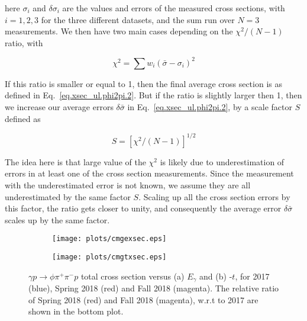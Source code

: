 \noindent here $\sigma_{i}$ and $\delta \sigma_{i}$ are the values and errors of the measured cross sections, with $i=1,2,3$ for the three different datasets, and the sum run over $N=3$ measurements. We then have two main cases depending on the $\chi^{2}/(N-1)$ ratio, with 

\begin{equation}
    \label{eq.xsec_ul.phi2pi.3}
    \chi^{2} = \sum w_{i}(\bar{\sigma}-\sigma_{i})^2
\end{equation}

If this ratio is smaller or equal to 1, then the final average cross section is as defined in Eq.~\ref{eq.xsec_ul.phi2pi.2}. But if the ratio is slightly larger then 1, then we increase our average errors $\delta\bar{\sigma}$ in Eq.~\ref{eq.xsec_ul.phi2pi.2}, by a scale factor $S$ defined as

\begin{equation}
    \label{eq.xsec_ul.phi2pi.4}
    S = [\chi^{2}/(N-1)]^{1/2}
\end{equation}

The idea here is that large value of the $\chi^{2}$ is likely due to underestimation of errors in at least one of the cross section measurements. Since the measurement with the underestimated error is not known, we assume they are all underestimated by the same factor $S$. Scaling up all the cross section errors by this factor, the ratio gets closer to unity, and consequently the average error $\delta\bar{\sigma}$ scales up by the same factor.

\begin{center}
\null
\vfill
\begin{figure}[H]
    \centering
    \begin{subfigure}[b]{0.5\textwidth}
        \texttt{[image: plots/cmgexsec.eps]}
        \caption{}
        \label{fig.xsec_ul.phi2pi.10.a}
    \end{subfigure}\hfill
    \begin{subfigure}[b]{0.5\textwidth}
        \texttt{[image: plots/cmgtxsec.eps]}
        \caption{}
        \label{fig.xsec_ul.phi2pi.10.b}
    \end{subfigure}
    \caption{\label{fig.xsec_ul.phi2pi.10}$\gamma p \rightarrow \phi \pi^{+} \pi^{-} p$ total cross section versus (a) $E_{\gamma}$ and (b) -$t$, for 2017 (blue), Spring 2018 (red) and Fall 2018 (magenta). The relative ratio of Spring 2018 (red) and Fall 2018 (magenta), w.r.t to 2017 are shown in the bottom plot.}
\end{figure}
\null
\vfill
\end{center}

